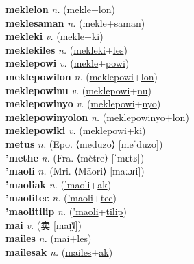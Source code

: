 \textbf{meklelon} \textit{n.} (\hyperref[mekle]{mekle}+\hyperref[lon]{lon})
 \label{meklelon} \\
\textbf{meklesaman} \textit{n.} (\hyperref[mekle]{mekle}+\hyperref[saman]{saman})
 \label{meklesaman} \\
\textbf{mekleki} \textit{v.} (\hyperref[mekle]{mekle}+\hyperref[ki]{ki})
 \label{mekleki} \\
\textbf{meklekiles} \textit{n.} (\hyperref[mekleki]{mekleki}+\hyperref[les]{les})
 \label{meklekiles} \\
\textbf{meklepowi} \textit{v.} (\hyperref[mekle]{mekle}+\hyperref[powi]{powi})
 \label{meklepowi} \\
\textbf{meklepowilon} \textit{n.} (\hyperref[meklepowi]{meklepowi}+\hyperref[lon]{lon})
 \label{meklepowilon} \\
\textbf{meklepowinu} \textit{v.} (\hyperref[meklepowi]{meklepowi}+\hyperref[nu]{nu})
 \label{meklepowinu} \\
\textbf{meklepowinyo} \textit{v.} (\hyperref[meklepowi]{meklepowi}+\hyperref[nyo]{nyo})
 \label{meklepowinyo} \\
\textbf{meklepowinyolon} \textit{n.} (\hyperref[meklepowinyo]{meklepowinyo}+\hyperref[lon]{lon})
 \label{meklepowinyolon} \\
\textbf{meklepowiki} \textit{v.} (\hyperref[meklepowi]{meklepowi}+\hyperref[ki]{ki})
 \label{meklepowiki} \\
\textbf{metus} \textit{n.} (Epo. ⟨meduzo⟩ [meˈduzo])
 \label{metus} \\
\textbf{'methe} \textit{n.} (Fra. ⟨mètre⟩ [ˈmɛtʁ])
 \label{'methe} \\
\textbf{'maoli} \textit{n.} (Mri. ⟨Māori⟩ [maːɔɾi])
 \label{'maoli} \\
\textbf{'maoliak} \textit{n.} (\hyperref['maoli]{'maoli}+\hyperref[ak]{ak})
 \label{'maoliak} \\
\textbf{'maolitec} \textit{n.} (\hyperref['maoli]{'maoli}+\hyperref[tec]{tec})
 \label{'maolitec} \\
\textbf{'maolitilip} \textit{n.} (\hyperref['maoli]{'maoli}+\hyperref[tilip]{tilip})
 \label{'maolitilip} \\
\textbf{mai} \textit{v.} ({\chinese{}卖} [maɪ̯˥˩])
 \label{mai} \\
\textbf{mailes} \textit{n.} (\hyperref[mai]{mai}+\hyperref[les]{les})
 \label{mailes} \\
\textbf{mailesak} \textit{n.} (\hyperref[mailes]{mailes}+\hyperref[ak]{ak})
 \label{mailesak} \\

